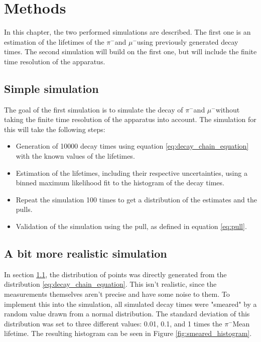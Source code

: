 \documentclass[11pt, a4paper, oneside]{book}
\newcommand{\pion}{$\pi^{-}$}
\newcommand{\muon}{$\mu^{-}$}
\begin{document}
\FloatBarrier
\chapter{Methods}
In this chapter, the two performed simulations are described. The first one is an estimation of the lifetimes of the \pion and \muon using previously generated decay times. The second simulation will build on the first one, but will include the finite time resolution of the apparatus. 

\section{Simple simulation} \label{sec:simple_simulation}
The goal of the first simulation is to simulate the decay of \pion and \muon without taking the finite time resolution of the apparatus into account. The simulation for this will take the following steps:
\begin{itemize}
  \item Generation of \num{10000} decay times using equation \ref{eq:decay_chain_equation} with the known    values of the lifetimes.
  \item Estimation of the lifetimes, including their respective uncertainties, using a binned maximum likelihood fit to the histogram of the decay times.
  \item Repeat the simulation \num{100} times to get a distribution of the estimates and the pulls.
  \item Validation of the simulation using the pull, as defined in equation \ref{eq:pull}.
\end{itemize}

\section{A bit more realistic simulation} \label{sec:realistic_simulation}
In section \ref{sec:simple_simulation}, the distribution of points was directly generated from the distribution \ref{eq:decay_chain_equation}. This isn't realistic, since the measurements themselves aren't precise and have some noise to them. To implement this into the simulation, all simulated decay times were "smeared" by a random value drawn from a normal distribution. The standard deviation of this distribution was set to three different values: 0.01, 0.1, and 1 times the \pion Mean lifetime. The resulting histogram can be seen in Figure \ref{fig:smeared_histogram}.
\end{document}
